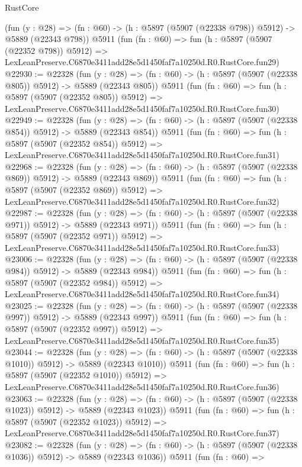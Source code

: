 \begin{lexlean}{RustCore}
\begin{coremodule}
    (fun (y : @28) => (fn : @60) -> (h : @5897 (@5907 (@22338 @798)) @5912) -> @5889 (@22343 @798))
    @5911
    (fun (fn : @60) =>
    fun (h : @5897 (@5907 (@22352 @798)) @5912) =>
    LexLeanPreserve.C6870e3411add28e5d1450faf7a10250d.R0.RustCore.fun29)
@22930 := @22328
    (fun (y : @28) => (fn : @60) -> (h : @5897 (@5907 (@22338 @805)) @5912) -> @5889 (@22343 @805))
    @5911
    (fun (fn : @60) =>
    fun (h : @5897 (@5907 (@22352 @805)) @5912) =>
    LexLeanPreserve.C6870e3411add28e5d1450faf7a10250d.R0.RustCore.fun30)
@22949 := @22328
    (fun (y : @28) => (fn : @60) -> (h : @5897 (@5907 (@22338 @854)) @5912) -> @5889 (@22343 @854))
    @5911
    (fun (fn : @60) =>
    fun (h : @5897 (@5907 (@22352 @854)) @5912) =>
    LexLeanPreserve.C6870e3411add28e5d1450faf7a10250d.R0.RustCore.fun31)
@22968 := @22328
    (fun (y : @28) => (fn : @60) -> (h : @5897 (@5907 (@22338 @869)) @5912) -> @5889 (@22343 @869))
    @5911
    (fun (fn : @60) =>
    fun (h : @5897 (@5907 (@22352 @869)) @5912) =>
    LexLeanPreserve.C6870e3411add28e5d1450faf7a10250d.R0.RustCore.fun32)
@22987 := @22328
    (fun (y : @28) => (fn : @60) -> (h : @5897 (@5907 (@22338 @971)) @5912) -> @5889 (@22343 @971))
    @5911
    (fun (fn : @60) =>
    fun (h : @5897 (@5907 (@22352 @971)) @5912) =>
    LexLeanPreserve.C6870e3411add28e5d1450faf7a10250d.R0.RustCore.fun33)
@23006 := @22328
    (fun (y : @28) => (fn : @60) -> (h : @5897 (@5907 (@22338 @984)) @5912) -> @5889 (@22343 @984))
    @5911
    (fun (fn : @60) =>
    fun (h : @5897 (@5907 (@22352 @984)) @5912) =>
    LexLeanPreserve.C6870e3411add28e5d1450faf7a10250d.R0.RustCore.fun34)
@23025 := @22328
    (fun (y : @28) => (fn : @60) -> (h : @5897 (@5907 (@22338 @997)) @5912) -> @5889 (@22343 @997))
    @5911
    (fun (fn : @60) =>
    fun (h : @5897 (@5907 (@22352 @997)) @5912) =>
    LexLeanPreserve.C6870e3411add28e5d1450faf7a10250d.R0.RustCore.fun35)
@23044 := @22328
    (fun (y : @28) =>
    (fn : @60) -> (h : @5897 (@5907 (@22338 @1010)) @5912) -> @5889 (@22343 @1010))
    @5911
    (fun (fn : @60) =>
    fun (h : @5897 (@5907 (@22352 @1010)) @5912) =>
    LexLeanPreserve.C6870e3411add28e5d1450faf7a10250d.R0.RustCore.fun36)
@23063 := @22328
    (fun (y : @28) =>
    (fn : @60) -> (h : @5897 (@5907 (@22338 @1023)) @5912) -> @5889 (@22343 @1023))
    @5911
    (fun (fn : @60) =>
    fun (h : @5897 (@5907 (@22352 @1023)) @5912) =>
    LexLeanPreserve.C6870e3411add28e5d1450faf7a10250d.R0.RustCore.fun37)
@23082 := @22328
    (fun (y : @28) =>
    (fn : @60) -> (h : @5897 (@5907 (@22338 @1036)) @5912) -> @5889 (@22343 @1036))
    @5911
    (fun (fn : @60) =>

\end{coremodule}
\end{lexlean}
